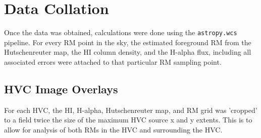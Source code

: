 \section{Data Collation}
\label{sec:collation}

Once the data was obtained, calculations were done using the \verb|astropy.wcs| pipeline. For every RM point in the sky, the estimated foreground RM from the Hutschenreuter map, the HI column density, and the H-alpha flux, including all associated errors were attached to that particular RM sampling point.

\subsection{HVC Image Overlays}
\label{ssec:hvc_snapshot}

For each HVC, the HI, H-alpha, Hutschenreuter map, and RM grid was 'cropped' to a field twice the size of the maximum HVC source x and y extents. This is to allow for analysis of both RMs in the HVC and surrounding the HVC.


